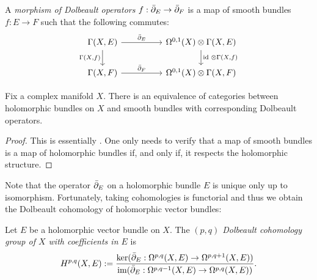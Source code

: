 \documentclass[12pt]{ociamthesis}  %
\begin{document}
\begin{definition}
  A \emph{morphism of Dolbeault operators} $f : \bar{\partial}_E \to \bar{\partial}_F$
  is a map of smooth bundles $f : E\to F$ such that the following commutes:
  \begin{equation*}
    \begin{tikzcd}
      {\Gamma(X,E)} && {\Omega^{0,1}(X)\otimes \Gamma(X,E)} \\
      {\Gamma(X,F)} && {\Omega^{0,1}(X)\otimes \Gamma(X,F)}
      \arrow["{\bar\partial_E}", from=1-1, to=1-3]
      \arrow["{\Gamma(X,f)}"', from=1-1, to=2-1]
      \arrow["{\identity\,\otimes \Gamma(X,f)}", from=1-3, to=2-3]
      \arrow["{\bar\partial_F}", from=2-1, to=2-3]
    \end{tikzcd}
  \end{equation*}
\end{definition}

\begin{theorem}
  Fix a complex manifold $X$. There is an equivalence of categories
  between holomorphic bundles on $X$ and smooth bundles with corresponding
  Dolbeault operators.
  \begin{proof}
    This is essentially \cite[Theorem 3.2]{moroianu2004}. One only
    needs to verify that a map of smooth bundles is a map of
    holomorphic bundles if, and only if, it respects the holomorphic
    structure. 
  \end{proof}
\end{theorem}

Note that the operator $\bar{\partial}_E$ on a holomorphic bundle $E$ is
unique only up to isomorphism. Fortunately, taking cohomologies
is functorial and thus we obtain the Dolbeault cohomology of
holomorphic vector bundles:

\begin{definition}
  Let $E$ be a holomorphic vector bundle on $X$. The \emph{$(p,q)$
  Dolbeault cohomology group of $X$ with coefficients in $E$} is
  \begin{align*}
    H^{p,q}(X,E) := \frac{
      \ker(\bar{\partial}_E : \Omega^{p,q}(X,E) \to \Omega^{p,q+1}(X,E))
    }{
      \operatorname{im}(\bar{\partial}_E : \Omega^{p,q-1}(X,E) \to \Omega^{p,q}(X,E))
    }.
  \end{align*}
\end{definition}
\end{document}

